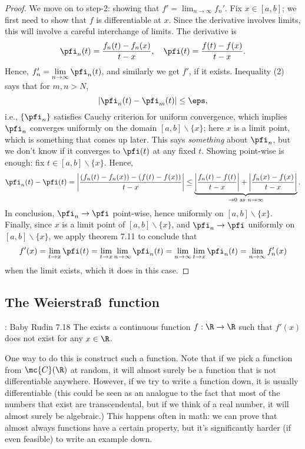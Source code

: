 \begin{proof}
	We move on to step-2: showing that \(\displaystyle f'=\lim_{n\to\infty}f_n'\). Fix \(x\in[a,b]\); we first need to show that \(f\) is differentiable at \(x\). Since the derivative involves limits, this will involve a careful interchange of limits. The derivative is
	\begin{equation*}
		\pfi_n(t)=\frac{f_n(t)-f_n(x)}{t-x},\quad\pfi(t)=\frac{f(t)-f(x)}{t-x}.
	\end{equation*}
	Hence, \(f_n'=\displaystyle\lim_{n\to\infty}\pfi_n(t)\), and similarly we get \(f'\), if it exists. Inequality (2) says that for \(m,n>N\),
	\begin{equation*}
		|\pfi_n(t)-\pfi_m(t)|\leq \eps,
	\end{equation*}
	i.e., \(\{\pfi_n\}\) satisfies Cauchy criterion for uniform convergence, which implies \(\pfi_n\) converges uniformly on the domain \([a,b]\backslash\{x\}\); here \(x\) is a limit point, which is something that comes up later. This says \emph{something} about \(\pfi_n\), but we don't know if it converges to \(\pfi(t)\) at any fixed \(t\). Showing point-wise is enough: fix \(t\in[a,b]\backslash\{x\}\). Hence, 
	\begin{equation*}
		\pfi_n(t)-\pfi(t)=\left|\frac{(f_n(t)-f_n(x))-(f(t)-f(x))}{t-x}\right|\leq\underbrace{\left|\frac{f_n(t)-f(t)}{t-x}\right|+\left|\frac{f_n(x)-f(x)}{t-x}\right|}_{\to 0~\text{as}~n\to\infty}.
	\end{equation*}
	In conclusion, \(\pfi_n\to\pfi\) point-wise, hence uniformly on \([a,b]\backslash\{x\}\). Finally, since \(x\) is a limit point of \([a,b]\backslash\{x\}\), and \(\pfi_n\to\pfi\) uniformly on \([a,b]\backslash\{x\}\), we apply theorem 7.11 to conclude that 
	\begin{equation*}
		f'(x)=\lim_{t\to x}\pfi(t)=\lim_{t\to x}\lim_{n\to\infty}\pfi_n(t)=\lim_{n\to\infty}\lim_{t\to x}\pfi_n(t)=\lim_{n\to\infty}f_n'(x)
	\end{equation*}
	when the limit exists, which it does in this case.
\end{proof}

\subsection{The Weierstra\ss~function}
\begin{ntheorem}{: Baby Rudin 7.18}
	The exists a continuous function \(f:\R\to\R\) such that \(f'(x)\) does not exist for any \(x\in\R\).
\end{ntheorem}
One way to do this is construct such a function. Note that if we pick a function from \(\mc{C}(\R)\) at random, it will almost surely be a function that is not differentiable anywhere. However, if we try to write a function down, it is usually differentiable (this could be seen as an analogue to the fact that most of the numbers that exist are transcendental, but if we think of a real number, it will almost surely be algebraic.) This happens often in math: we can prove that almost always functions have a certain property, but it's significantly harder (if even feasible) to write an example down.

